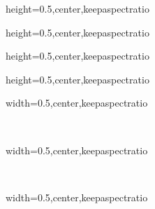 \documentclass{article}
\begin{document}
\begin{adjustbox}{height=0.5\paperheight,center,keepaspectratio}
\end{adjustbox}
\begin{adjustbox}{height=0.5\paperheight,center,keepaspectratio}
\end{adjustbox}
\begin{adjustbox}{height=0.5\paperheight,center,keepaspectratio}
\end{adjustbox}
\begin{adjustbox}{height=0.5\paperheight,center,keepaspectratio}
\end{adjustbox}

\begin{adjustbox}{width=0.5\paperwidth,center,keepaspectratio}
\end{adjustbox}\\


\begin{adjustbox}{width=0.5\paperwidth,center,keepaspectratio}
\end{adjustbox}\\

\begin{adjustbox}{width=0.5\paperwidth,center,keepaspectratio}
\end{adjustbox}\\


 \\
\\
\\
\\
\\


\end{document}
